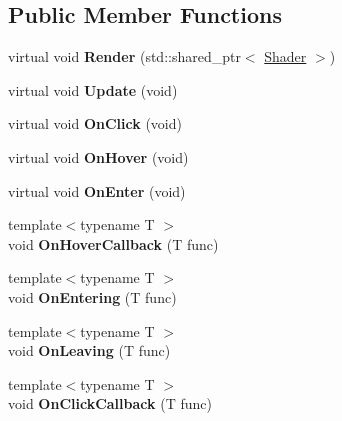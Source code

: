 \subsection*{Public Member Functions}
\begin{DoxyCompactItemize}
\item 
virtual void {\bfseries Render} (std\+::shared\+\_\+ptr$<$ \hyperlink{class_shader}{Shader} $>$)\hypertarget{class_widget_acaeb0105afb4227b96628699ae5d8b0d}{}\label{class_widget_acaeb0105afb4227b96628699ae5d8b0d}

\item 
virtual void {\bfseries Update} (void)\hypertarget{class_widget_a8e3cfdd705bcfca539768af140e320ea}{}\label{class_widget_a8e3cfdd705bcfca539768af140e320ea}

\item 
virtual void {\bfseries On\+Click} (void)\hypertarget{class_widget_a8b9b5713f9e2cee7a572c9b158a55ae4}{}\label{class_widget_a8b9b5713f9e2cee7a572c9b158a55ae4}

\item 
virtual void {\bfseries On\+Hover} (void)\hypertarget{class_widget_a3f1a123ec0c9efef589f9fda1afc7b1c}{}\label{class_widget_a3f1a123ec0c9efef589f9fda1afc7b1c}

\item 
virtual void {\bfseries On\+Enter} (void)\hypertarget{class_widget_acf3a38830f6e84b3b4f81489178f036a}{}\label{class_widget_acf3a38830f6e84b3b4f81489178f036a}

\item 
{\footnotesize template$<$typename T $>$ }\\void {\bfseries On\+Hover\+Callback} (T func)\hypertarget{class_widget_ae13b11021fe3bcfc0f9c211c0b717238}{}\label{class_widget_ae13b11021fe3bcfc0f9c211c0b717238}

\item 
{\footnotesize template$<$typename T $>$ }\\void {\bfseries On\+Entering} (T func)\hypertarget{class_widget_a2b0b2a610a67e886215869c8d3224af0}{}\label{class_widget_a2b0b2a610a67e886215869c8d3224af0}

\item 
{\footnotesize template$<$typename T $>$ }\\void {\bfseries On\+Leaving} (T func)\hypertarget{class_widget_af33e3f6857d50acb7c8a6619f1594f1c}{}\label{class_widget_af33e3f6857d50acb7c8a6619f1594f1c}

\item 
{\footnotesize template$<$typename T $>$ }\\void {\bfseries On\+Click\+Callback} (T func)\hypertarget{class_widget_ae37a112907267862c15f377a31dfe392}{}\label{class_widget_ae37a112907267862c15f377a31dfe392}


\end{DoxyCompactItemize}
